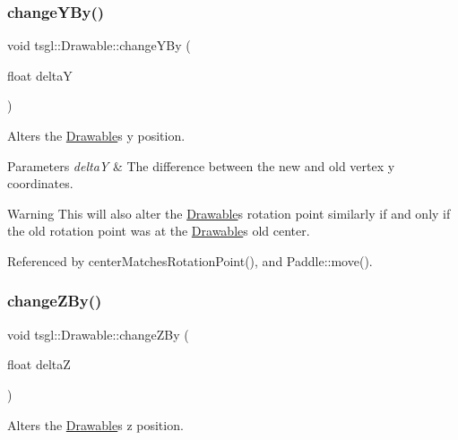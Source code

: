 \subsubsection{\texorpdfstring{change\+Y\+By()}{changeYBy()}}
{\footnotesize\ttfamily void tsgl\+::\+Drawable\+::change\+Y\+By (\begin{DoxyParamCaption}\item[{float}]{deltaY }\end{DoxyParamCaption})\hspace{0.3cm}{\ttfamily [virtual]}}



Alters the \hyperlink{classtsgl_1_1_drawable}{Drawable}\textquotesingle{}s y position. 


\begin{DoxyParams}{Parameters}
{\em deltaY} & The difference between the new and old vertex y coordinates. \\
\hline
\end{DoxyParams}
\begin{DoxyWarning}{Warning}
This will also alter the \hyperlink{classtsgl_1_1_drawable}{Drawable}\textquotesingle{}s rotation point similarly if and only if the old rotation point was at the \hyperlink{classtsgl_1_1_drawable}{Drawable}\textquotesingle{}s old center. 
\end{DoxyWarning}


Referenced by center\+Matches\+Rotation\+Point(), and Paddle\+::move().

\mbox{\label{classtsgl_1_1_drawable_a4497615a4e1e03c40a745fd80c1f51e0}} 
\subsubsection{\texorpdfstring{change\+Z\+By()}{changeZBy()}}
{\footnotesize\ttfamily void tsgl\+::\+Drawable\+::change\+Z\+By (\begin{DoxyParamCaption}\item[{float}]{deltaZ }\end{DoxyParamCaption})\hspace{0.3cm}{\ttfamily [virtual]}}



Alters the \hyperlink{classtsgl_1_1_drawable}{Drawable}\textquotesingle{}s z position. 


